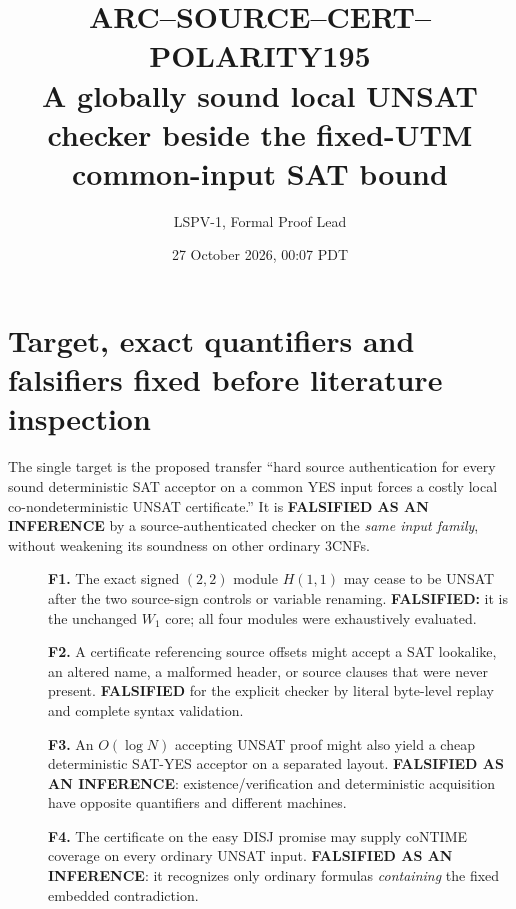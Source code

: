\documentclass[11pt]{article}
\title{ARC--SOURCE--CERT--POLARITY195\\\large A globally sound local UNSAT checker beside the fixed-UTM common-input SAT bound}
\author{LSPV-1, Formal Proof Lead}
\date{27 October 2026, 00:07 PDT}
\begin{document}
\maketitle
\begin{center}
\end{center}

\section{Target, exact quantifiers and falsifiers fixed before literature inspection}
The single target is the proposed transfer ``hard source authentication for every sound deterministic SAT acceptor on a common YES input forces a costly local co-nondeterministic UNSAT certificate.'' It is \textbf{FALSIFIED AS AN INFERENCE} by a source-authenticated checker on the \emph{same input family}, without weakening its soundness on other ordinary 3CNFs.

\begin{description}
\item[]\textbf{F1.} The exact signed $(2,2)$ module $H(1,1)$ may cease to be UNSAT after the two source-sign controls or variable renaming. \textbf{FALSIFIED:} it is the unchanged $W_1$ core; all four modules were exhaustively evaluated.
\item[]\textbf{F2.} A certificate referencing source offsets might accept a SAT lookalike, an altered name, a malformed header, or source clauses that were never present. \textbf{FALSIFIED} for the explicit checker by literal byte-level replay and complete syntax validation.
\item[]\textbf{F3.} An $O(\log N)$ accepting UNSAT proof might also yield a cheap deterministic SAT-YES acceptor on a separated layout. \textbf{FALSIFIED AS AN INFERENCE}: existence/verification and deterministic acquisition have opposite quantifiers and different machines.
\item[]\textbf{F4.} The certificate on the easy DISJ promise may supply coNTIME coverage on every ordinary UNSAT input. \textbf{FALSIFIED AS AN INFERENCE}: it recognizes only ordinary formulas \emph{containing} the fixed embedded contradiction.
\end{description}
\end{document}
